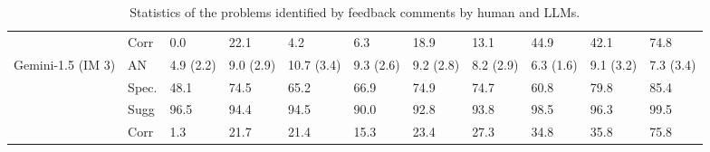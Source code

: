 \begin{table}[]
\begin{tabular}{lllllllllll}
                  & Corr &       0.0 &      22.1 &        4.2 &       6.3 &      18.9 &      13.1 &      44.9 &      42.1 &      74.8 \\
Gemini-1.5 (IM 3) &         AN & 4.9 (2.2) & 9.0 (2.9) & 10.7 (3.4) & 9.3 (2.6) & 9.2 (2.8) & 8.2 (2.9) & 6.3 (1.6) & 9.1 (3.2) & 7.3 (3.4) \\
                  &   Spec. &      48.1 &      74.5 &       65.2 &      66.9 &      74.9 &      74.7 &      60.8 &      79.8 &      85.4 \\
                  & Sugg &      96.5 &      94.4 &       94.5 &      90.0 &      92.8 &      93.8 &      98.5 &      96.3 &      99.5 \\
                  & Corr &       1.3 &      21.7 &       21.4 &      15.3 &      23.4 &      27.3 &      34.8 &      35.8 &      75.8 \\
\bottomrule
\end{tabular}
    
    \caption{Statistics of the problems identified by feedback comments by human and LLMs.}
    \label{tab:StatsProblems}
    
\end{table}